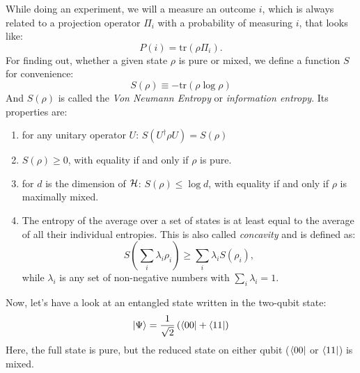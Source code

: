 	 While doing an experiment, we will a measure an outcome $i$, which is always related to a projection operator $\Pi_i$ with a probability of measuring $i$, that looks like: 
		 \begin{equation}
	 		P(i)=\mathrm{tr}(\rho\Pi_i).
	 	\end{equation}
	 For finding out, whether a given state $\rho$ is pure or mixed, we define a function $S$ for convenience:
		\begin{equation}
			S(\rho)\equiv -\mathrm{tr}(\rho \log \rho)
		\end{equation}	 	
	And $S(\rho)$ is called the \textit{Von Neumann Entropy} or \textit{information entropy}. 
	Its properties are:
{}
	\begin{enumerate}[\hspace{0.5cm}•]
		\item for any unitary operator $U$: $S(U^\dagger \rho U)=S(\rho)$
		\item $S(\rho)\geq 0$, with equality if and only if $\rho$ is pure. 
		\item for $d$ is the dimension of $\mathcal{H}$: $S(\rho)\leq \log d$, with equality if and only if $\rho$ is maximally mixed.
		\item The entropy of the average over a set of states is at least equal to the average of all their individual entropies. This is also called \textit{concavity} and is defined as:
		\begin{equation}
			S \left(\sum_i \lambda_i \rho_i \right) \geq \sum_i \lambda_i S(\rho_i),
		\end{equation}
			while $\lambda_i$ is any set of non-negative numbers with $\sum_i \lambda_i =1$.
	\end{enumerate}
	\FloatBarrier
	Now, let's have a look at an entangled state written in the two-qubit state:
		\begin{equation}
			| \Psi \rangle = \frac{1}{\sqrt{2}} \left(\langle 00 | + \langle 11 | \right)
		\end{equation}
	Here, the full state is pure, but the reduced state on either qubit ($\langle 00 |$ or $\langle 11 |$) is mixed. \\
	
